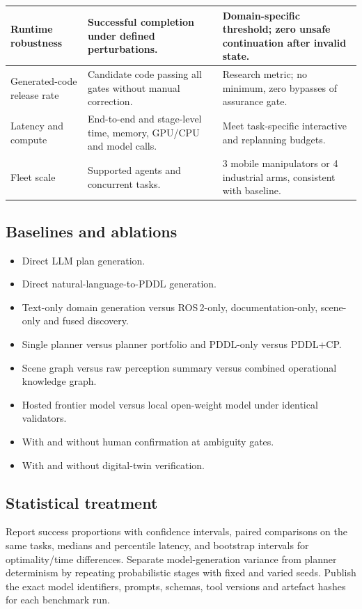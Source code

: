 \documentclass{plan4ari_report}
\begin{document}
{\begin{longtable}{|L{3.6cm}|L{6.0cm}|L{5.7cm}|}
Runtime robustness & Successful completion under defined perturbations. & Domain-specific threshold; zero unsafe continuation after invalid state. \\ \hline
Generated-code release rate & Candidate code passing all gates without manual correction. & Research metric; no minimum, zero bypasses of assurance gate. \\ \hline
Latency and compute & End-to-end and stage-level time, memory, GPU/CPU and model calls. & Meet task-specific interactive and replanning budgets. \\ \hline
Fleet scale & Supported agents and concurrent tasks. & 3 mobile manipulators or 4 industrial arms, consistent with baseline. \\ \hline
\end{longtable}}

\subsection{Baselines and ablations}
\begin{itemize}
\item Direct LLM plan generation.
\item Direct natural-language-to-PDDL generation.
\item Text-only domain generation versus ROS\,2-only, documentation-only, scene-only and fused discovery.
\item Single planner versus planner portfolio and PDDL-only versus PDDL+CP.
\item Scene graph versus raw perception summary versus combined operational knowledge graph.
\item Hosted frontier model versus local open-weight model under identical validators.
\item With and without human confirmation at ambiguity gates.
\item With and without digital-twin verification.
\end{itemize}

\subsection{Statistical treatment}
Report success proportions with confidence intervals, paired comparisons on the same tasks, medians and percentile latency, and bootstrap intervals for optimality/time differences. Separate model-generation variance from planner determinism by repeating probabilistic stages with fixed and varied seeds. Publish the exact model identifiers, prompts, schemas, tool versions and artefact hashes for each benchmark run.
\end{document}
